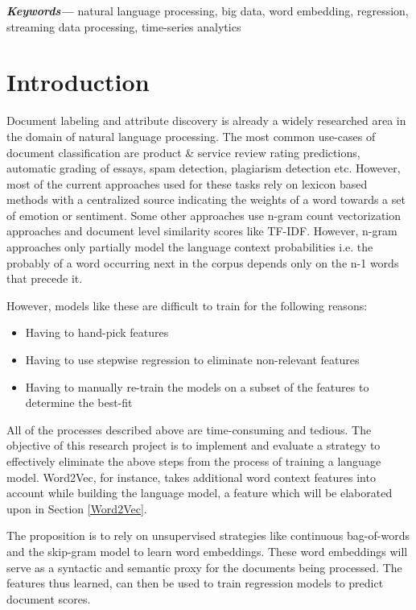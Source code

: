 \documentclass[conference]{IEEEtran}
\begin{document}
\vspace{5mm}

\providecommand{\keywords}[1]{\textbf{\textit{Keywords---}} #1}
\keywords{natural language processing, big data, word embedding, regression, streaming data processing, time-series analytics}

\IEEEpeerreviewmaketitle

\vspace{5mm}

\section{Introduction}
    Document labeling and attribute discovery is already a widely researched area in the domain of natural language processing.
    The most common use-cases of document classification are product \& service review rating predictions, automatic grading of essays, spam detection, plagiarism detection etc.
    However, most of the current approaches used for these tasks rely on lexicon based methods with a centralized source indicating the weights of a word towards a set of emotion or sentiment.
    Some other approaches use n-gram count vectorization approaches and document level similarity scores like TF-IDF.
    However, n-gram approaches only partially model the language context probabilities i.e. the probably of a word occurring next in the corpus depends only on the n-1 words that precede it.

    However, models like these are difficult to train for the following reasons:
    \begin{itemize}
      \item Having to hand-pick features
      \item Having to use stepwise regression to eliminate non-relevant features
      \item Having to manually re-train the models on a subset of the features to determine the best-fit
    \end{itemize}

    All of the processes described above are time-consuming and tedious. 
    The objective of this research project is to implement and evaluate a strategy to effectively eliminate the above steps from the process of training a language model. 
    Word2Vec, for instance, takes additional word context features into account while building the language model, a feature which will be elaborated upon in Section \ref{Word2Vec}.

    The proposition is to rely on unsupervised strategies like continuous bag-of-words and the skip-gram model to learn word embeddings.
    These word embeddings will serve as a syntactic and semantic proxy for the documents being processed. 
    The features thus learned, can then be used to train regression models to predict document scores.
\end{document}

